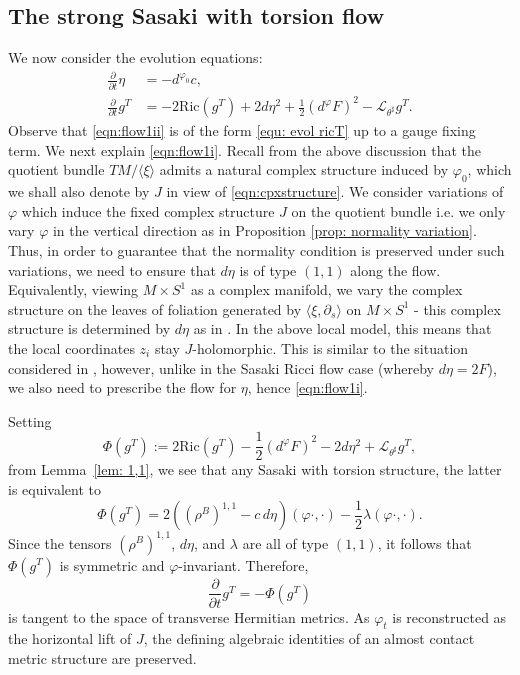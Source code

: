 \documentclass{article}
\theoremstyle{definition}
\renewcommand{\phi}{\varphi}
\numberwithin{equation}{section}
\begin{document}
\subsection{The strong Sasaki with torsion flow}
We now consider the  evolution equations:
\begin{align}
\frac{\partial}{
\partial t
}\eta
&=
-d^{\phi_0} c,\label{eqn:flow1i}\\
\frac{\partial}{
\partial t
}g^T
&=
-2\mathrm{Ric}(g^T)
+2d\eta^2+\frac12(d^\phi F)^2 
-\mathcal L_{\theta^\sharp}g^T
.\label{eqn:flow1ii}
\end{align}
Observe that \eqref{eqn:flow1ii} is of the form \eqref{equ: evol ricT} up to a gauge fixing term. We next explain \eqref{eqn:flow1i}. 
Recall from the above discussion that the quotient bundle $TM/\langle \xi\rangle$ admits a natural complex structure induced by $\varphi_0$, which we shall also denote by $J$ in view of \eqref{eqn:cpxstructure}. We consider variations of $\varphi$ which induce the fixed complex structure $J$ on the quotient bundle i.e.
we only vary $\varphi$ in the vertical direction as in Proposition \ref{prop: normality variation}. Thus, in order to guarantee that the normality condition is preserved under such variations, we need to ensure that $d\eta$ is of type $(1,1)$ along the flow. Equivalently, viewing $M\times S^1$ as a complex manifold, we vary the complex structure on the leaves of foliation generated by $\langle\xi,\partial_s\rangle$
on $M\times S^1$ - this complex structure is determined by $d\eta$ as in \cite{Goldstein2004}. In the above local model, this means that the local coordinates $z_i$ stay $J$-holomorphic. This is similar to the situation considered in \cite{Smoczyk2010}, however, unlike in the Sasaki Ricci flow case (whereby $d\eta=2F$), we also need to prescribe the flow for $\eta$, hence \eqref{eqn:flow1i}. 

Setting
\[
\Phi(g^T)
:=
2\mathrm{Ric}(g^T)-\frac12(d^\phi F)^2 -2 d\eta^2
+\mathcal L_{\theta^\sharp}g^T,
\]
from Lemma~\ref{lem: 1,1}, we see that any Sasaki with torsion structure, the latter is equivalent to
\[
\Phi(g^T)
=
2\left((\rho^B)^{1,1}-c\,d\eta\right)(\phi\cdot,\cdot)
-\frac12\lambda(\phi\cdot,\cdot).
\]
Since the tensors $(\rho^B)^{1,1}$, $d\eta$, and $\lambda$ are all of type $(1,1)$, it follows that $\Phi(g^T)$ is symmetric and $\phi$-invariant. Therefore,
\[
\frac{\partial}{\partial t}g^T=-\Phi(g^T)
\]
is tangent to the space of transverse Hermitian metrics. As $\phi_t$ is reconstructed as the horizontal lift of $J$, the defining algebraic identities of an almost contact metric structure are preserved. 
\end{document}
